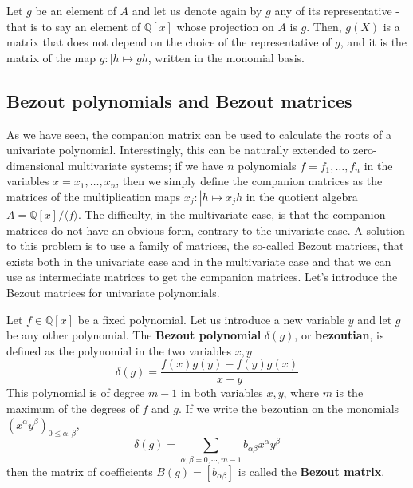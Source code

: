 \documentclass{standalone}
\begin{document}
\begin{rem}
Let $g$ be an element of $A$ and let us denote again by $g$ any of its representative - that is to say an element of $\mathbb{Q}[x]$ whose projection on $A$ is $g$. 
Then, $g(X)$ is a matrix that does not depend on the choice of the representative of $g$, and it is the matrix of the map $g:\left\vert h \mapsto gh \right.$, written in the monomial basis.
\end{rem}


\subsection{Bezout polynomials and Bezout matrices}


As we have seen, the companion matrix can be used to calculate the roots of a univariate polynomial. 
Interestingly, this can be naturally extended to zero-dimensional multivariate systems; 
if we have $n$ polynomials $f = f_1, \ldots, f_n$ in the variables $x = x_1, \ldots, x_n$, then we simply define the companion matrices as the matrices of the multiplication maps $x_j : \left\vert h \mapsto x_jh \right.$ in the quotient algebra $ A = \mathbb{Q}[x]/ \langle f\rangle$. 
The difficulty, in the multivariate case, is that the companion matrices do not have an obvious form, contrary to the univariate case. 
A solution to this problem is to use a family of matrices, the so-called Bezout matrices, that exists both in the univariate case and in the multivariate case and that we can use as intermediate matrices to get the companion matrices. 
Let's introduce the Bezout matrices for univariate polynomials.

\begin{defn}
\label{def_bez}
Let $f \in \mathbb{Q}[x]$ be a fixed polynomial. Let us introduce a new variable $y$ and let $g$ be any other polynomial. 
The {\bf Bezout polynomial} $\delta(g)$, or {\bf bezoutian}, is defined as the polynomial in the two variables $x, y$
$$
\delta(g) = \dfrac{f(x)g(y)-f(y)g(x)}{x-y}
$$
This polynomial is of degree $m-1$ in both variables $x, y$, where $m$ is the maximum of the degrees of $f$ and $g$.
If we write the bezoutian on the monomials $(x^\alpha y^\beta)_{0 \le \alpha,\beta}$,
\begin{equation}
\delta(g) = \sum_{\alpha,\beta = 0, \cdots, m-1} b_{\alpha\beta} x^\alpha y^\beta
\end{equation}
then the matrix of coefficients $B(g) = [b_{\alpha\beta}]$ is called the {\bf Bezout matrix}.
\end{defn}
\end{document}
